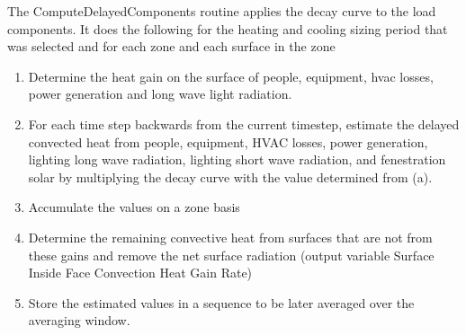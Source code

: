 The ComputeDelayedComponents routine applies the decay curve to the load components. It does the following for the heating and cooling sizing period that was selected and for each zone and each surface in the zone

\begin{enumerate}
\def\labelenumi{\arabic{enumi}.}
\item
  Determine the heat gain on the surface of people, equipment, hvac losses, power generation and long wave light radiation.
\item
  For each time step backwards from the current timestep, estimate the delayed convected heat from people, equipment, HVAC losses, power generation, lighting long wave radiation, lighting short wave radiation, and fenestration solar by multiplying the decay curve with the value determined from (a).
\item
  Accumulate the values on a zone basis
\item
  Determine the remaining convective heat from surfaces that are not from these gains and remove the net surface radiation (output variable Surface Inside Face Convection Heat Gain Rate)
\item
  Store the estimated values in a sequence to be later averaged over the averaging window.
\end{enumerate}
